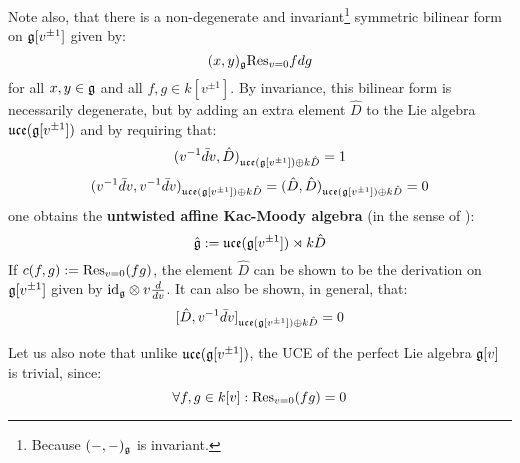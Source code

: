 \begin{example}
            Note also, that there is a non-degenerate and invariant\footnote{Because $(-, -)_{\mathfrak{g}}$ is invariant.} symmetric bilinear form on $\mathfrak{g}[v^{\pm 1}]$ given by:
                $$(x, y)_{\mathfrak{g}} \mathrm{Res}_{v = 0} f dg$$
            for all $x, y \in \mathfrak{g}$ and all $f, g \in k[v^{\pm 1}]$. By invariance, this bilinear form is necessarily degenerate, but by adding an extra element $\hat{D}$ to the Lie algebra $\mathfrak{uce}(\mathfrak{g}[v^{\pm 1}])$ and by requiring that:
                $$(v^{-1} \bar{d}v, \hat{D})_{\mathfrak{uce}(\mathfrak{g}[v^{\pm 1}]) \oplus k \hat{D}} = 1$$
                $$(v^{-1} \bar{d}v, v^{-1} \bar{d}v)_{\mathfrak{uce}(\mathfrak{g}[v^{\pm 1}]) \oplus k \hat{D}} = (\hat{D}, \hat{D})_{\mathfrak{uce}(\mathfrak{g}[v^{\pm 1}]) \oplus k \hat{D}} = 0$$
            one obtains the \textbf{untwisted affine Kac-Moody algebra} (in the sense of \cite[Chapter 7]{kac_infinite_dimensional_lie_algebras}):
                $$\hat{\mathfrak{g}} := \mathfrak{uce}(\mathfrak{g}[v^{\pm 1}]) \rtimes k \hat{D}$$
            If $c(f, g) := \mathrm{Res}_{v = 0}(fg)$, the element $\hat{D}$ can be shown to be the derivation on $\mathfrak{g}[v^{\pm 1}]$ given by $\id_{\g} \tensor v \frac{d}{dv}$. It can also be shown, in general, that:
                $$[\hat{D}, v^{-1} \bar{d}v]_{\mathfrak{uce}(\mathfrak{g}[v^{\pm 1}]) \oplus k \hat{D}} = 0$$

            Let us also note that unlike $\mathfrak{uce}(\mathfrak{g}[v^{\pm 1}])$, the UCE of the perfect Lie algebra $\mathfrak{g}[v]$ is trivial, since:
                $$\forall f, g \in k[v]: \mathrm{Res}_{v = 0}(fg) = 0$$
        \end{example}
